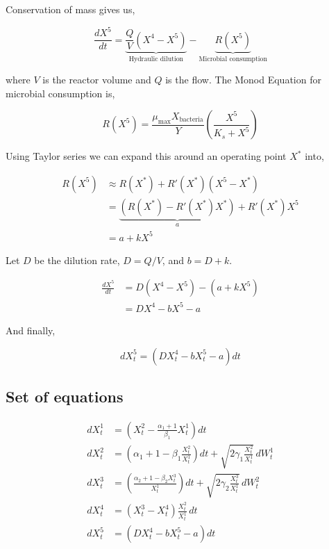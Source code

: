 \documentclass[conference]{IEEEtran}
\renewcommand{\medskip}{\vspace{1\baselineskip}}
\theoremstyle{definitionsc}
\theoremstyle{plainsc}
\theoremstyle{remarksc}
\begin{document}
Conservation of mass gives us,

\begin{equation}
	\frac{dX^5}{dt} = \underbrace{\frac{Q}{V}(X^4 - X^5)}_{\text{Hydraulic dilution}} - \underbrace{R(X^5)}_{\text{Microbial consumption}}
\end{equation}

where $V$ is the reactor volume and $Q$ is the flow. The Monod Equation for microbial consumption \cite{monodeq} is, 

\begin{equation*}
	R(X^5) = \frac{\mu_{\max} X_{\text{bacteria}}}{Y} \left( \frac{X^5}{K_s + X^5} \right)
\end{equation*}

Using Taylor series we can expand this around an operating point $X^*$ into,

\begin{align*}
	R(X^5) &\approx R(X^*) + R'(X^*)(X^5 - X^*)\\
	&= \underbrace{( R(X^*) - R'(X^*)X^* )}_{a} + {R'(X^*)} X^5\\
	&= a + k X^5
\end{align*}

Let $D$ be the dilution rate, $D = Q/V$, and $b = D + k$.

\begin{align*}
	\frac{dX^5}{dt} &= D(X^4 - X^5) - ( a + k X^5 )\\
	&= D X^4 - b X^5 - a
\end{align*}

And finally,

\begin{equation}
\label{eq:Xt5}
	dX_t^5 = \left( D X_t^4 - b X_t^5 - a \right) dt
\end{equation}







\medskip








\subsection*{\textbf{Set of equations}}

\begin{align*}
	dX_t^1
&=
\left(X_t^2 - \frac{\alpha_1 + 1}{\beta_1} X_t^1\right)dt
\\[8pt]
dX_t^2
&=
\left(
\alpha_1 + 1
-
\beta_1 \frac{X_t^2}{X_t^1}
\right)dt
+
\sqrt{
2\gamma_1 \frac{X_t^2}{X_t^1}
}\,dW_t^1
\\[8pt]
dX_t^3
&=
\left(
\frac{\alpha_2 + 1 - \beta_2 X_t^3}{X_t^1}
\right)dt
+
\sqrt{
2\gamma_2 \frac{X_t^3}{X_t^1}
}\,dW_t^2
\\[8pt]
dX_t^4
&=
(X_t^3 - X_t^4)
\frac{X_t^2}{X_t^1}\,dt
\\[8pt]
dX_t^5
&=
\left(D X_t^4 - b X_t^5 - a\right)dt
\end{align*}
\end{document}
